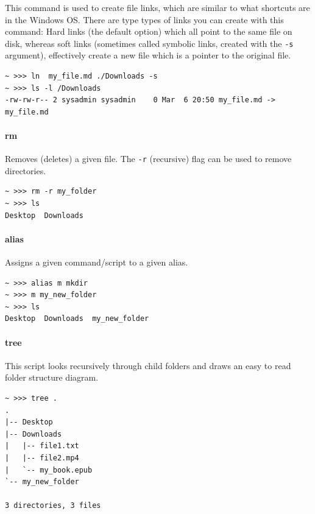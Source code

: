 This command is used to create file links, which are similar to what shortcuts are in the Windows OS. There are type types of links you can create with this command: Hard links (the default option) which all point to the same file on disk, whereas soft links (sometimes called symbolic links, created with the \texttt{-s} argument), effectively create a new file which is a pointer to the original file.

\begin{verbatim}
~ >>> ln  my_file.md ./Downloads -s
~ >>> ls -l /Downloads
-rw-rw-r-- 2 sysadmin sysadmin    0 Mar  6 20:50 my_file.md -> 
my_file.md
\end{verbatim}

\hypertarget{rm}{%
\paragraph{rm}\label{rm}}

Removes (deletes) a given file. The \texttt{-r} (recursive) flag can be used to remove directories.

\begin{verbatim}
~ >>> rm -r my_folder
~ >>> ls
Desktop  Downloads
\end{verbatim}

\hypertarget{alias}{%
\paragraph{alias}\label{alias}}

Assigns a given command/script to a given alias.

\begin{verbatim}
~ >>> alias m mkdir
~ >>> m my_new_folder
~ >>> ls
Desktop  Downloads  my_new_folder
\end{verbatim}

\hypertarget{tree}{%
\paragraph{tree}\label{tree}}

This script looks recursively through child folders and draws an easy to read folder structure diagram.


\pagebreak

\begin{verbatim}
~ >>> tree .
.
|-- Desktop
|-- Downloads
|   |-- file1.txt
|   |-- file2.mp4
|   `-- my_book.epub
`-- my_new_folder

3 directories, 3 files
\end{verbatim}

